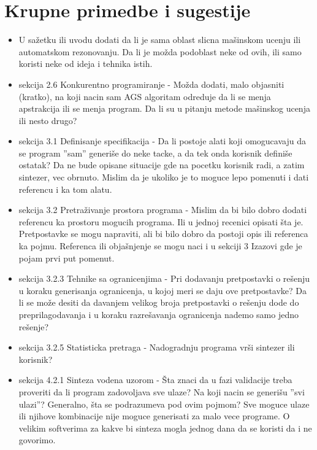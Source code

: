 \documentclass[a4paper]{report}
\begin{document}
\section{Krupne primedbe i sugestije}
\begin{itemize}
    \item U sažetku ili uvodu dodati da li je sama oblast slicna mašinskom ucenju ili automatskom rezonovanju. Da li je možda podoblast neke od ovih, ili samo koristi neke od ideja i tehnika istih.\\
    \item sekcija 2.6 Konkurentno programiranje - Možda dodati, malo objasniti (kratko), na koji nacin sam AGS algoritam odreduje da li se menja apstrakcija ili se menja program. Da li su u pitanju metode mašinskog ucenja ili nesto drugo?\\
    \item sekcija 3.1 Definisanje specifikacija - Da li postoje alati koji omogucavaju da se program ''sam'' generiše do neke tacke, a da tek onda korisnik definiše ostatak? Da ne bude opisane situacije gde na pocetku korisnik radi, a zatim sintezer, vec obrnuto. Mislim da je ukoliko je to moguce lepo pomenuti i dati referencu i ka tom alatu.\\
    \item sekcija 3.2 Pretraživanje prostora programa - Mislim da bi bilo dobro dodati referencu ka prostoru mogucih programa. Ili u jednoj recenici opisati šta je. Pretpostavke se mogu napraviti, ali bi bilo dobro da postoji opis ili referenca ka pojmu. Referenca ili objašnjenje se mogu naci i u sekciji 3 Izazovi gde je pojam prvi put pomenut.\\
    \item sekcija 3.2.3 Tehnike sa ogranicenjima - Pri dodavanju pretpostavki o rešenju u koraku generisanja ogranicenja, u kojoj meri se daju ove pretpostavke? Da li se može desiti da davanjem velikog broja pretpostavki o rešenju dode do preprilagodavanja i u koraku razrešavanja ogranicenja nademo samo jedno rešenje?\\
    \item sekcija 3.2.5 Statisticka pretraga - Nadogradnju programa vrši sintezer ili korisnik?\\
    \item sekcija 4.2.1 Sinteza vodena uzorom - Šta znaci da u fazi validacije treba proveriti da li program zadovoljava sve ulaze? Na koji nacin se generišu ''svi ulazi''? Generalno, šta se podrazumeva pod ovim pojmom? Sve moguce ulaze ili njihove kombinacije nije moguce generisati za malo vece programe. O velikim softverima za kakve bi sinteza mogla jednog dana da se koristi da i ne govorimo.\\
\end{itemize}
\end{document}
